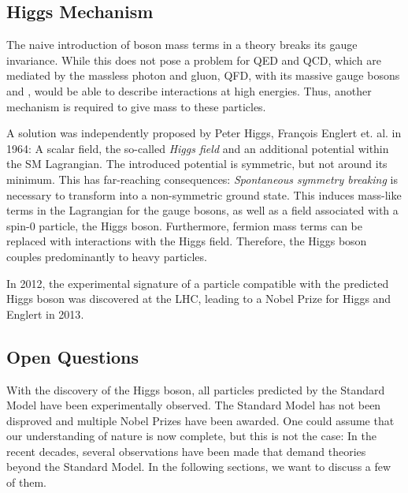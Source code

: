 \subsection{Higgs Mechanism}
The naive introduction of boson mass terms in a theory breaks its gauge invariance. While this does not pose a problem for \ac{QED} and \ac{QCD}, which are mediated by the massless photon and gluon, \ac{QFD}, with its massive gauge bosons \PW and \PZ, would be able to describe interactions at high energies.
Thus, another mechanism is required to give mass to these particles.

A solution was independently proposed by Peter Higgs\cite{Higgs:BrokenSymmetriesMasses}, François Englert et. al. \cite{Englert:BrokenSymmetryMass} in 1964: A scalar field, the so-called \emph{Higgs field} and an additional potential within the \ac{SM} Lagrangian. The introduced potential is symmetric, but not around its minimum. This has far-reaching consequences: \emph{Spontaneous symmetry breaking} is necessary to transform into a non-symmetric ground state. This induces mass-like terms in the Lagrangian for the gauge bosons, as well as a field associated with a spin-0 particle, the Higgs boson. Furthermore, fermion mass terms can be replaced with interactions with the Higgs field. Therefore, the Higgs boson couples predominantly to heavy particles.

In 2012, the experimental signature of a particle compatible with the predicted Higgs boson was discovered at the \ac{LHC}\cite{CMSCollaboration:Observationnewboson,ATLASCollaboration:Observationnewparticle}, leading to a Nobel Prize for Higgs and Englert in 2013\cite{NobelMedia:NobelPrize2013}.

\subsection{Open Questions}
With the discovery of the Higgs boson, all particles predicted by the Standard Model have been experimentally observed. The Standard Model has not been disproved and multiple Nobel Prizes have been awarded.
One could assume that our understanding of nature is now complete, but this is not the case:
In the recent decades, several observations have been made that demand  theories beyond the Standard Model. In the following sections, we want to discuss a few of them.


